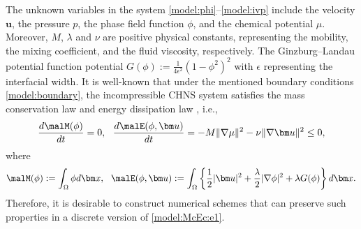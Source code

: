 The unknown variables in the system \eqref{model:phi}--\eqref{model:ivp} include the  velocity $\bm u$, the  pressure $p$, the phase field function $\phi$, and the chemical potential $\mu$. Moreover, $M$, $\lambda$ and $\nu$ are positive physical constants, representing the mobility, the mixing coefficient, and the fluid viscosity, respectively. The Ginzburg--Landau potential function  potential $G(\phi):=\frac{1}{4 \epsilon^2}(1-\phi^2)^2$ with $\epsilon$ representing the interfacial width.    
It is well-known that under the mentioned boundary conditions \eqref{model:boundary}, the incompressible CHNS system satisfies the mass conservation law \cite{li2023consistency} and energy dissipation law \cite{li2022fully}, i.e.,
\begin{equation}\label{model:McEc:e1}
	\frac{d \malM(\phi)}{d t}=0, ~~ \frac{d \malE(\phi,  \bm u)}{d t} 	=-M\|\nabla \mu\|^2-\nu\|\nabla  \bm u\|^2 \le  0,
\end{equation}
where 
\begin{equation}\label{model:McEc:e2}
	\malM(\phi) :=\int_{\Omega} \phi d \bm x,~~  
	\malE(\phi,  \bm u) :=\int_{\Omega} \left\{\frac{1}{2}| \bm u|^2+\frac{\lambda}{2}|\nabla  \phi|^2+ \lambda G(\phi)\right\} d  \bm x. 
\end{equation}
Therefore, it is desirable to construct numerical schemes that can preserve such properties in a discrete version of \eqref{model:McEc:e1}.

